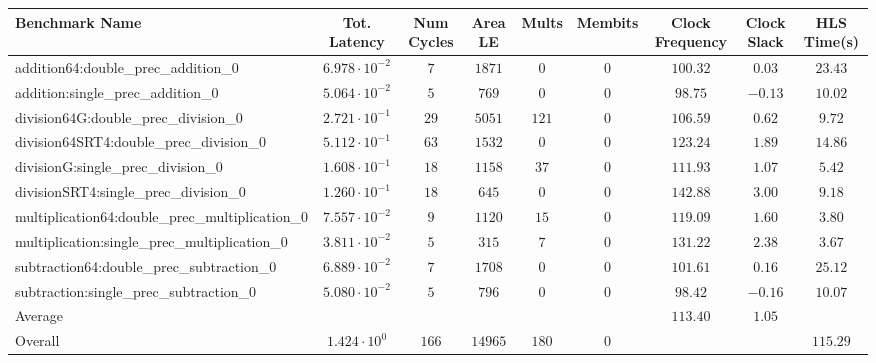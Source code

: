 \begin{tabular}{|l|c|c|c|c|c|c|c|c|}
\hline
Benchmark Name                                   & Tot. Latency            & Num Cycles & Area LE   & Mults   & Membits & Clock Frequency & Clock Slack & HLS Time(s) \\
\hline
addition64:double\_prec\_addition\_0             & $ 6.978 \cdot 10^{-2} $ & $ 7      $ & $ 1871  $ & $ 0   $ & $ 0   $ & $ 100.32      $ & $ 0.03    $ & $ 23.43   $ \\
addition:single\_prec\_addition\_0               & $ 5.064 \cdot 10^{-2} $ & $ 5      $ & $ 769   $ & $ 0   $ & $ 0   $ & $ 98.75       $ & $ -0.13   $ & $ 10.02   $ \\
division64G:double\_prec\_division\_0            & $ 2.721 \cdot 10^{-1} $ & $ 29     $ & $ 5051  $ & $ 121 $ & $ 0   $ & $ 106.59      $ & $ 0.62    $ & $ 9.72    $ \\
division64SRT4:double\_prec\_division\_0         & $ 5.112 \cdot 10^{-1} $ & $ 63     $ & $ 1532  $ & $ 0   $ & $ 0   $ & $ 123.24      $ & $ 1.89    $ & $ 14.86   $ \\
divisionG:single\_prec\_division\_0              & $ 1.608 \cdot 10^{-1} $ & $ 18     $ & $ 1158  $ & $ 37  $ & $ 0   $ & $ 111.93      $ & $ 1.07    $ & $ 5.42    $ \\
divisionSRT4:single\_prec\_division\_0           & $ 1.260 \cdot 10^{-1} $ & $ 18     $ & $ 645   $ & $ 0   $ & $ 0   $ & $ 142.88      $ & $ 3.00    $ & $ 9.18    $ \\
multiplication64:double\_prec\_multiplication\_0 & $ 7.557 \cdot 10^{-2} $ & $ 9      $ & $ 1120  $ & $ 15  $ & $ 0   $ & $ 119.09      $ & $ 1.60    $ & $ 3.80    $ \\
multiplication:single\_prec\_multiplication\_0   & $ 3.811 \cdot 10^{-2} $ & $ 5      $ & $ 315   $ & $ 7   $ & $ 0   $ & $ 131.22      $ & $ 2.38    $ & $ 3.67    $ \\
subtraction64:double\_prec\_subtraction\_0       & $ 6.889 \cdot 10^{-2} $ & $ 7      $ & $ 1708  $ & $ 0   $ & $ 0   $ & $ 101.61      $ & $ 0.16    $ & $ 25.12   $ \\
subtraction:single\_prec\_subtraction\_0         & $ 5.080 \cdot 10^{-2} $ & $ 5      $ & $ 796   $ & $ 0   $ & $ 0   $ & $ 98.42       $ & $ -0.16   $ & $ 10.07   $ \\
\hline
Average                                          & $                     $ & $        $ & $       $ & $     $ & $     $ & $ 113.40      $ & $ 1.05    $ & $         $ \\
\hline
Overall                                          & $ 1.424 \cdot 10^{0}  $ & $ 166    $ & $ 14965 $ & $ 180 $ & $ 0   $ & $             $ & $         $ & $ 115.29  $ \\
\hline
\end{tabular}
